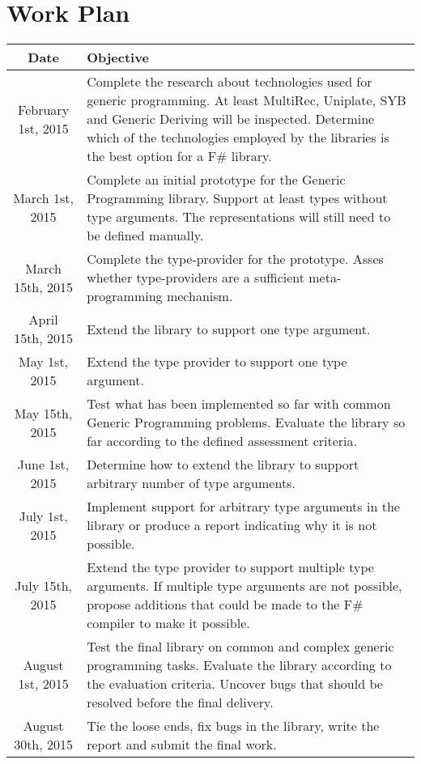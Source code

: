 \documentclass[8pt]{extarticle}
\begin{document}
\section{Work Plan}
\begin{tabular}{|c|p{12cm}|}
\hline
{\bf Date} & {\bf Objective} \\
\hline
February 1st, 2015 & Complete the research about technologies used for generic programming. At least MultiRec\cite{MultiRec}, Uniplate\cite{Uniplate}, SYB\cite{SYB} and Generic Deriving \cite{GenericDeriving} will be inspected. Determine which of the technologies employed by the libraries is the best option for a F\# library. \\
\hline
March 1st, 2015 & Complete an initial prototype for the Generic Programming library. Support at least types without type arguments. The representations will still need to be defined manually. \\
\hline
March 15th, 2015 & Complete the type-provider for the prototype. Asses whether type-providers are a sufficient meta-programming mechanism. \\
\hline
April 15th, 2015 & Extend the library to support one type argument. \\
\hline
May 1st, 2015 & Extend the type provider to support one type argument. \\
\hline
May 15th, 2015 & Test what has been implemented so far with common Generic Programming problems. Evaluate the library so far according to the defined assessment criteria. \\
\hline
June 1st, 2015 & Determine how to extend the library to support arbitrary number of type arguments. \\
\hline
July 1st, 2015 & Implement support for arbitrary type arguments in the library or produce a report indicating why it is not possible. \\
\hline
July 15th, 2015 & Extend the type provider to support multiple type arguments. If multiple type arguments are not possible, propose additions that could be made to the F\# compiler to make it possible. \\
\hline
August 1st, 2015 & Test the final library on common and complex generic programming tasks. Evaluate the library according to the evaluation criteria. Uncover bugs that should be resolved before the final delivery. \\
\hline
August 30th, 2015 & Tie the loose ends, fix bugs in the library, write the report and submit the final work. \\
\hline
\end{tabular}


\end{document}
